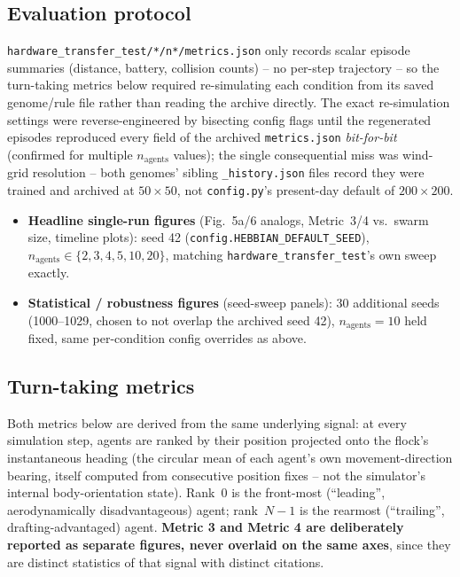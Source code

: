 \documentclass[11pt]{article}
\begin{document}
\subsection{Evaluation protocol}
\label{sec:protocol}
\texttt{hardware\_transfer\_test/*/n*/metrics.json} only records scalar episode summaries
(distance, battery, collision counts) -- no per-step trajectory -- so the turn-taking metrics
below required re-simulating each condition from its saved genome/rule file rather than reading
the archive directly. The exact re-simulation settings were reverse-engineered by bisecting
config flags until the regenerated episodes reproduced every field of the archived
\texttt{metrics.json} \emph{bit-for-bit} (confirmed for multiple $n_{\text{agents}}$ values); the
single consequential miss was wind-grid resolution -- both genomes' sibling \texttt{\_history.json}
files record they were trained and archived at $50{\times}50$, not \texttt{config.py}'s present-day
default of $200{\times}200$.

\begin{itemize}
\item \textbf{Headline single-run figures} (Fig.~5a/6 analogs, Metric~3/4 vs.\ swarm size,
  timeline plots): seed 42 (\texttt{config.HEBBIAN\_DEFAULT\_SEED}), $n_{\text{agents}} \in
  \{2,3,4,5,10,20\}$, matching \texttt{hardware\_transfer\_test}'s own sweep exactly.
\item \textbf{Statistical / robustness figures} (seed-sweep panels): 30 additional seeds
  (1000--1029, chosen to not overlap the archived seed 42), $n_{\text{agents}}=10$ held fixed,
  same per-condition config overrides as above.
\end{itemize}

\subsection{Turn-taking metrics}
\label{sec:metrics-def}
Both metrics below are derived from the same underlying signal: at every simulation step, agents
are ranked by their position projected onto the flock's instantaneous heading (the circular mean
of each agent's own movement-direction bearing, itself computed from consecutive position
fixes -- not the simulator's internal body-orientation state). Rank~0 is the front-most
(``leading'', aerodynamically disadvantageous) agent; rank~$N{-}1$ is the rearmost (``trailing'',
drafting-advantaged) agent. \textbf{Metric 3 and Metric 4 are deliberately reported as separate
figures, never overlaid on the same axes}, since they are distinct statistics of that signal with
distinct citations.
\end{document}
